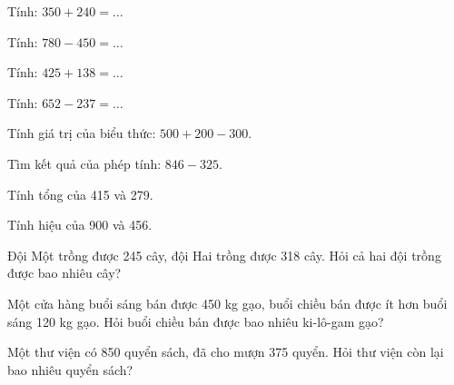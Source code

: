 \begin{ex}
Tính: $350 + 240 = \dots$
\end{ex}

\begin{ex}
Tính: $780 - 450 = \dots$
\end{ex}

\begin{ex}
Tính: $425 + 138 = \dots$
\end{ex}

\begin{ex}
Tính: $652 - 237 = \dots$
\end{ex}

\begin{ex}
Tính giá trị của biểu thức: $500 + 200 - 300$.
\end{ex}

\begin{ex}
Tìm kết quả của phép tính: $846 - 325$.
\end{ex}

\begin{ex}
Tính tổng của 415 và 279.
\end{ex}

\begin{ex}
Tính hiệu của 900 và 456.
\end{ex}

\begin{ex}
Đội Một trồng được 245 cây, đội Hai trồng được 318 cây. Hỏi cả hai đội trồng được bao nhiêu cây?
\end{ex}

\begin{ex}
Một cửa hàng buổi sáng bán được 450 kg gạo, buổi chiều bán được ít hơn buổi sáng 120 kg gạo. Hỏi buổi chiều bán được bao nhiêu ki-lô-gam gạo?
\end{ex}

\begin{ex}
Một thư viện có 850 quyển sách, đã cho mượn 375 quyển. Hỏi thư viện còn lại bao nhiêu quyển sách?
\end{ex}

